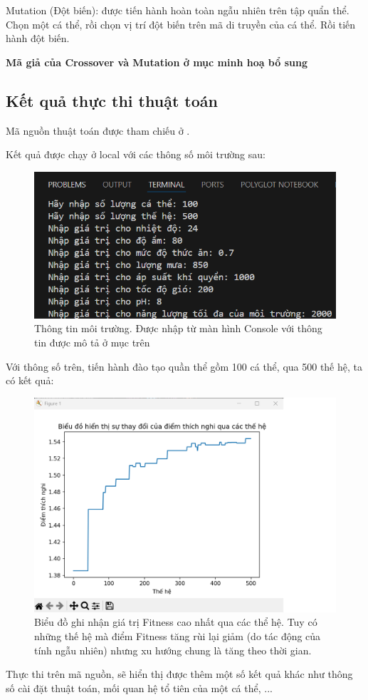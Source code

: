 	Mutation (Đột biến): được tiến hành hoàn toàn ngẫu nhiên trên tập quẩn thể. Chọn một cá thể, rồi chọn vị trí đột biến trên mã di truyền của cá thể. Rồi tiến hành đột biến.
	
	\textbf{Mã giả của Crossover và Mutation ở mục minh hoạ bổ sung}

\subsection{Kết quả thực thi thuật toán}
	Mã nguồn thuật toán được tham chiếu ở \cite{baolam}.
	
	Kết quả được chạy ở local với các thông số môi trường sau:
	\begin{figure}[h]
		\centering
		\includegraphics{figures/env_infor.png}
		\caption{Thông tin môi trường. Được nhập từ màn hình Console với thông tin được mô tả ở mục trên}
		\label{fig:env_infor}
	\end{figure}
	
	Với thông số trên, tiến hành đào tạo quần thể gồm 100 cá thể, qua 500 thế hệ, ta có kết quả:
	\begin{figure}[h]
		\centering
		\includegraphics[scale=0.6]{figures/result.png}
		\caption{Biểu đồ ghi nhận giá trị Fitness cao nhất qua các thể hệ. Tuy có những thế hệ mà điểm Fitness tăng rùi lại giảm (do tác động của tính ngẫu nhiên) nhưng xu hướng chung là tăng theo thời gian.}
		\label{fig:result}
	\end{figure}
	
	Thực thi trên mã nguồn, sẽ hiển thị được thêm một số kết quả khác như thông số cài đặt thuật toán, mối quan hệ tổ tiên của một cá thể, ...